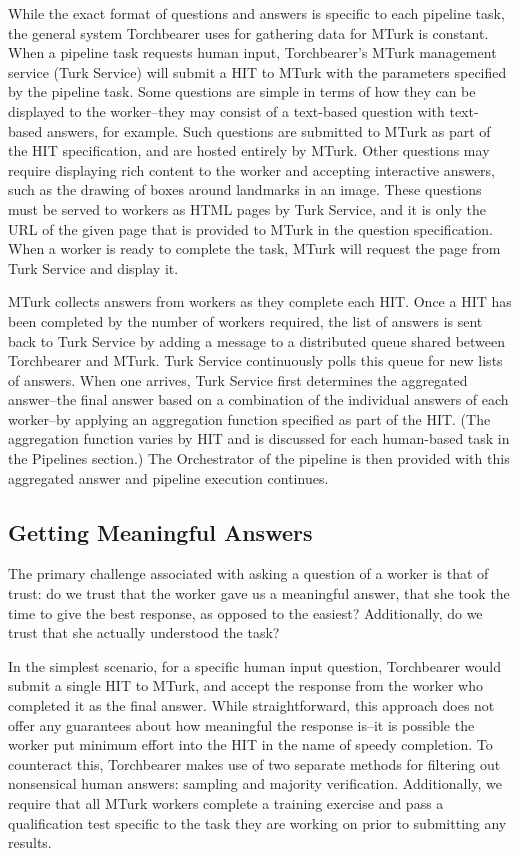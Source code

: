 While the exact format of questions and answers is specific to each pipeline task, the general system Torchbearer uses for gathering data for MTurk is constant. When a pipeline task requests human input, Torchbearer’s MTurk management service (Turk Service) will submit a HIT to MTurk with the parameters specified by the pipeline task. Some questions are simple in terms of how they can be displayed to the worker--they may consist of a text-based question with text-based answers, for example. Such questions are submitted to MTurk as part of the HIT specification, and are hosted entirely by MTurk. Other questions may require displaying rich content to the worker and accepting interactive answers, such as the drawing of boxes around landmarks in an image. These questions must be served to workers as HTML pages by Turk Service, and it is only the URL of the given page that is provided to MTurk in the question specification. When a worker is ready to complete the task, MTurk will request the page from Turk Service and display it.

MTurk collects answers from workers as they complete each HIT. Once a HIT has been completed by the number of workers required, the list of answers is sent back to Turk Service by adding a message to a distributed queue shared between Torchbearer and MTurk. Turk Service continuously polls this queue for new lists of answers. When one arrives, Turk Service first determines the aggregated answer--the final answer based on a combination of the individual answers of each worker--by applying an aggregation function specified as part of the HIT. (The aggregation function varies by HIT and is discussed for each human-based task in the Pipelines section.) The Orchestrator of the pipeline is then provided with this aggregated answer and pipeline execution continues.

\subsection{Getting Meaningful Answers}

The primary challenge associated with asking a question of a worker is that of trust: do we trust that the worker gave us a meaningful answer, that she took the time to give the best response, as opposed to the easiest? Additionally, do we trust that she actually understood the task? 

In the simplest scenario, for a specific human input question, Torchbearer would submit a single HIT to MTurk, and accept the response from the worker who completed it as the final answer. While straightforward, this approach does not offer any guarantees about how meaningful the response is--it is possible the worker put minimum effort into the HIT in the name of speedy completion. To counteract this, Torchbearer makes use of two separate methods for filtering out nonsensical human answers: sampling and majority verification. Additionally, we require that all MTurk workers complete a training exercise and pass a qualification test specific to the task they are working on prior to submitting any results.

